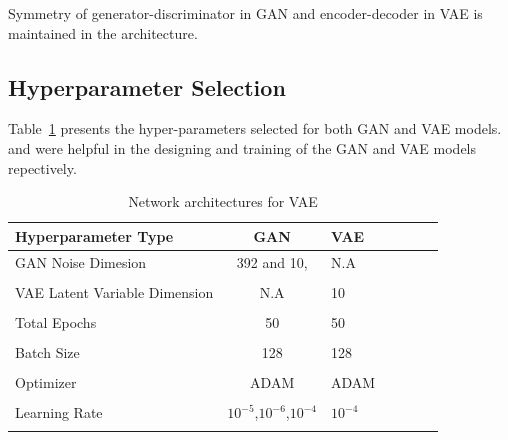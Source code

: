 \documentclass{article}
\begin{document}
	Symmetry of generator-discriminator in GAN and encoder-decoder in VAE is maintained in the architecture.  
	
	\subsection{Hyperparameter Selection}\label{subsection:Hyperparameter}
	
	Table~\ref{table:Hyperparameter} presents the hyper-parameters selected for both GAN and VAE models. \cite{GoodfellowNips:2016,} and \cite{kingmaIntroduction:2019} were helpful in the designing and training of the GAN and VAE models repectively.
				
	\begin{table}[t]
		\caption{Network architectures for VAE}
		\label{table:Hyperparameter}
		\centering
		\begin{tabular}{lclclcl}
			
			\toprule
			
			Hyperparameter Type & GAN & VAE \\
			
			\midrule
			
		    GAN Noise Dimesion    			&	392 and 10,     & N.A  \\
											&       	        &    \\
			VAE Latent Variable Dimension   & N.A     	    & 10    \\
											&      	        &   \\
											
			\midrule
														
			Total Epochs 					& 50     	    & 50   \\
						  					&      	        &   \\
		    Batch Size    					& 128     	    & 128  \\
		    			  					&      	        &   \\
		    			  					
		    \midrule
		    			  					
		    Optimizer    					& ADAM     	    & ADAM   \\
						 					&      	        &   \\
		    Learning Rate				    &$10^{-5}$,$10^{-6}$,$10^{-4}$ & $10^{-4}$    \\
		    		        
											&      	        &   \\
											
			\midrule
								  	

\end{tabular}
\end{table}
\end{document}
